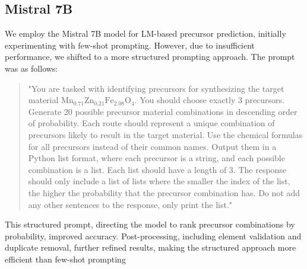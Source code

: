 \subsection{Mistral 7B}
We employ the Mistral 7B model for LM-based precursor prediction, initially experimenting with few-shot prompting. However, due to insufficient performance, we shifted to a more structured prompting approach. The prompt was as follows: \begin{quote} "You are tasked with identifying precursors for synthesizing the target material \( \text{Mn}_{0.71}\text{Zn}_{0.21}\text{Fe}_{2.08}\text{O}_4 \). You should choose exactly 3 precursors. Generate 20 possible precursor material combinations in descending order of probability. Each route should represent a unique combination of precursors likely to result in the target material. Use the chemical formulas for all precursors instead of their common names. Output them in a Python list format, where each precursor is a string, and each possible combination is a list. Each list should have a length of 3. The response should only include a list of lists where the smaller the index of the list, the higher the probability that the precursor combination has. Do not add any other sentences to the response, only print the list."
\end{quote}This structured prompt, directing the model to rank precursor combinations by probability, improved accuracy. Post-processing, including element validation and duplicate removal, further refined results, making the structured approach more efficient than few-shot prompting

\begin{table*}[htb!]
\centering
\small %
\caption{\textbf{Performance results for Mistral.} Mistral evaluated across three datasets: (a) Complete Reaction Archive, (b) Distinct Reactions, and (c) Novel Material Systems. Bold values indicate the best performance and underline the second best. All scores are reported as averages over five runs, with standard deviations in parentheses.}
\end{table*}

